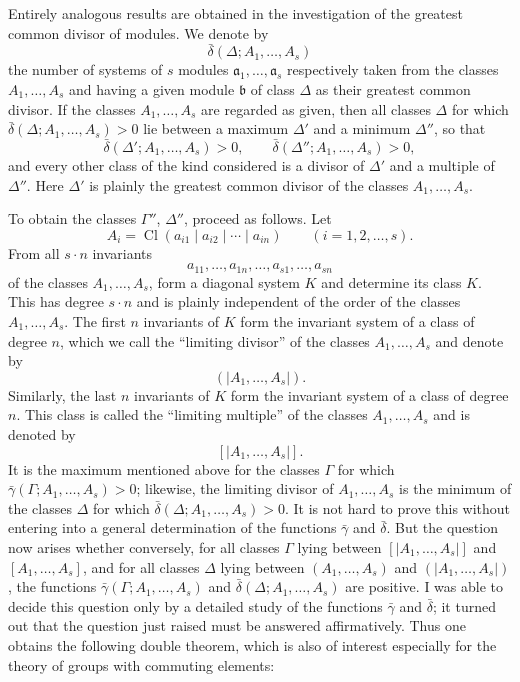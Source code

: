 \documentclass[11pt,a4paper]{article}
\newcommand{\Cl}{\operatorname{Cl}}
\begin{document}
Entirely analogous results are obtained in the investigation of the greatest common divisor of modules. We denote by
\[
 \bar\delta(\Delta;A_1,\ldots,A_s)
\]
the number of systems of $s$ modules $\mathfrak a_1,\ldots,\mathfrak a_s$ respectively taken from the classes $A_1,\ldots,A_s$ and having a given module $\mathfrak b$ of class $\Delta$ as their greatest common divisor. If the classes $A_1,\ldots,A_s$ are regarded as given, then all classes $\Delta$ for which $\bar\delta(\Delta;A_1,\ldots,A_s)>0$ lie between a maximum $\Delta'$ and a minimum $\Delta''$, so that
\[
 \bar\delta(\Delta';A_1,\ldots,A_s)>0,
 \qquad
 \bar\delta(\Delta'';A_1,\ldots,A_s)>0,
\]
and every other class of the kind considered is a divisor of $\Delta'$ and a multiple of $\Delta''$. Here $\Delta'$ is plainly the greatest common divisor of the classes $A_1,\ldots,A_s$.

To obtain the classes $\Gamma''$, $\Delta''$, proceed as follows. Let
\[
 A_i=\Cl(a_{i1}\mid a_{i2}\mid\cdots\mid a_{in})\qquad (i=1,2,\ldots,s).
\]
From all $s\cdot n$ invariants
\[
 a_{11},\ldots,a_{1n},\ldots,a_{s1},\ldots,a_{sn}
\]
of the classes $A_1,\ldots,A_s$, form a diagonal system $K$ and determine its class $K$. This has degree $s\cdot n$ and is plainly independent of the order of the classes $A_1,\ldots,A_s$. The first $n$ invariants of $K$ form the invariant system of a class of degree $n$, which we call the ``limiting divisor'' of the classes $A_1,\ldots,A_s$ and denote by
\[
 (\!|A_1,\ldots,A_s|\!).
\]
Similarly, the last $n$ invariants of $K$ form the invariant system of a class of degree $n$. This class is called the ``limiting multiple'' of the classes $A_1,\ldots,A_s$ and is denoted by
\[
 [\!|A_1,\ldots,A_s|\!].
\]
It is the maximum mentioned above for the classes $\Gamma$ for which $\bar\gamma(\Gamma;A_1,\ldots,A_s)>0$; likewise, the limiting divisor of $A_1,\ldots,A_s$ is the minimum of the classes $\Delta$ for which $\bar\delta(\Delta;A_1,\ldots,A_s)>0$. It is not hard to prove this without entering into a general determination of the functions $\bar\gamma$ and $\bar\delta$. But the question now arises whether conversely, for all classes $\Gamma$ lying between $[\!|A_1,\ldots,A_s|\!]$ and $[A_1,\ldots,A_s]$, and for all classes $\Delta$ lying between $(A_1,\ldots,A_s)$ and $(\!|A_1,\ldots,A_s|\!)$, the functions $\bar\gamma(\Gamma;A_1,\ldots,A_s)$ and $\bar\delta(\Delta;A_1,\ldots,A_s)$ are positive. I was able to decide this question only by a detailed study of the functions $\bar\gamma$ and $\bar\delta$; it turned out that the question just raised must be answered affirmatively. Thus one obtains the following double theorem, which is also of interest especially for the theory of groups with commuting elements:
\end{document}
